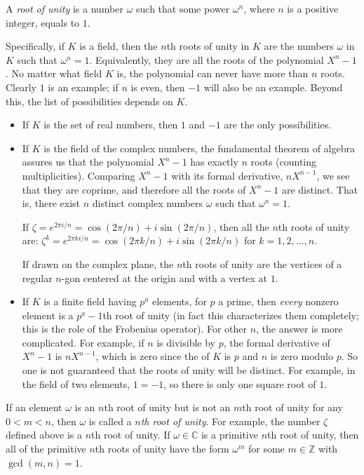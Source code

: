 \documentclass{article}
\begin{document}
A \emph{root of unity} is a number $\omega$ such that some power
$\omega^n$, where $n$ is a positive integer, equals to $1$.

Specifically, if $K$ is a field, then the $n$th roots of unity in $K$
are the numbers $\omega$ in $K$ such that $\omega^n = 1$.
Equivalently, they are all the roots of the polynomial $X^n-1$. No
matter what field $K$ is, the polynomial can never have more than $n$
roots.  Clearly $1$ is an example; if $n$ is even, then $-1$ will also
be an example. Beyond this, the list of possibilities depends on $K$.

\begin{itemize} 
\item If $K$ is the set of real numbers, then $1$ and $-1$ are the
only possibilities.

\item If $K$ is the field of the complex numbers, the fundamental
theorem of algebra assures us that the polynomial $X^n-1$ has exactly
$n$ roots (counting multiplicities).  Comparing $X^n-1$ with its
formal derivative, $nX^{n-1}$, we see that they are coprime, and
therefore all the roots of $X^n-1$ are distinct.  That is, there exist
$n$ distinct complex numbers $\omega$ such that $\omega^n=1$.

If $\zeta=e^{2\pi i/n}=\cos(2\pi/n)+i \sin(2\pi/n)$, then all the
$n$th roots of unity are: $\zeta^k=e^{2\pi ki/n}=\cos(2\pi k/n)+i
\sin(2\pi k/n)$ for $k=1,2,\ldots,n$.\medskip

If drawn on the complex plane, the $n$th roots of unity are the
vertices of a regular $n$-gon centered at the origin and with a vertex
at $1$.

\item If $K$ is a finite field having $p^a$ elements, for $p$ a prime,
then \emph{every} nonzero element is a $p^a-1$th root of unity (in
fact this characterizes them completely; this is the role of the
Frobenius operator).  For other $n$, the answer is more complicated.
For example, if $n$ is divisible by $p$, the formal derivative of
$X^n-1$ is $nX^{n-1}$, which is zero since the
 of $K$ is $p$ and $n$ is zero modulo
$p$.  So one is not guaranteed that the roots of unity will be
distinct.  For example, in the field of two elements, $1=-1$, so there
is only one square root of $1$.
\end{itemize}

If an element $\omega$ is an $n$th root of unity but is not an $m$th
root of unity for any $0<m<n$, then $\omega$ is called a
\emph{ $n$th root of unity}.  For example,
the number $\zeta$ defined above is a 
$n$th root of unity.  If $\omega \in \mathbb{C}$ is a primitive $n$th
root of unity, then all of the primitive $n$th roots of unity have the
form $\omega^m$ for some $m \in \mathbb{Z}$ with $\gcd(m,n)=1$.
\end{document}
